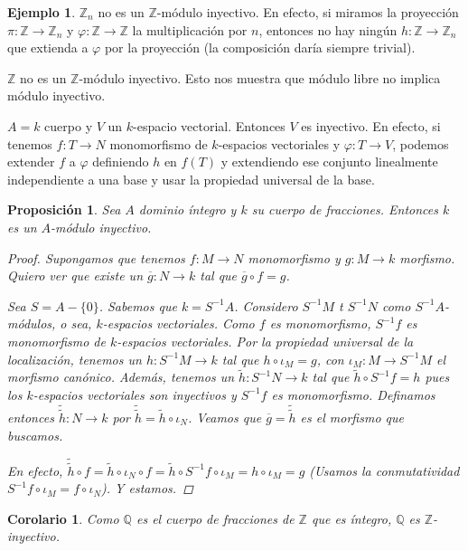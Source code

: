 \documentclass[12pt]{book}
\newtheorem{prop}[teo]{Proposición}
\newtheorem{cor}[teo]{Corolario}
\theoremstyle{definition}
\newtheorem{ex}[teo]{Ejemplo}
\newcommand{\ZZ}{\mathbb{Z}}      %
\newcommand{\QQ}{\mathbb{Q}}
\begin{document}
\begin{ex}
$\ZZ_n$ no es un $\ZZ$-módulo inyectivo. En efecto, si miramos la proyección $\pi:\ZZ\to\ZZ_n$ y $\varphi:\ZZ\to\ZZ$ la multiplicación por $n$, entonces no hay ningún $h:\ZZ\to\ZZ_n$ que extienda a $\varphi$ por la proyección (la composición daría siempre trivial).

$\ZZ$ no es un $\ZZ$-módulo inyectivo. Esto nos muestra que módulo libre no implica módulo inyectivo.

$A=k$ cuerpo y $V$ un $k$-espacio vectorial. Entonces $V$ es inyectivo. En efecto, si tenemos $f:T\to N$ monomorfismo de $k$-espacios vectoriales y $\varphi:T\to V$, podemos extender $f$ a $\varphi$ definiendo $h$ en $f(T)$ y extendiendo ese conjunto linealmente independiente a una base y usar la propiedad universal de la base.
\end{ex}

\begin{prop}
Sea $A$ dominio íntegro y $k$ su cuerpo de fracciones. Entonces $k$ es un $A$-módulo inyectivo.
\begin{proof}
Supongamos que tenemos $f:M\to N$ monomorfismo y $g:M\to k$ morfismo. Quiero ver que existe un $\overline{g}:N\to k$ tal que $\overline{g}\circ f = g$.

Sea $S=A-\{0\}$. Sabemos que $k=S^{-1}A$. Considero $S^{-1}M$ t $S^{-1}N$ como $S^{-1}A$-módulos, o sea, $k$-espacios vectoriales. Como $f$ es monomorfismo, $S^{-1}f$ es monomorfismo de $k$-espacios vectoriales. Por la propiedad universal de la localización, tenemos un $h:S^{-1}M\to k$ tal que $h\circ\iota_M = g$, con $\iota_M:M\to S^{-1}M$ el morfismo canónico. Además, tenemos un $\tilde{h}:S^{-1}N\to k$ tal que $\tilde{h}\circ S^{-1}f = h$ pues los $k$-espacios vectoriales son inyectivos y $S^{-1}f$ es monomorfismo. Definamos entonces $\tilde{\tilde{h}}:N\to k$ por $\tilde{\tilde{h}} = \tilde{h}\circ \iota_N$. Veamos que $\overline{g} = \tilde{\tilde{h}}$ es el morfismo que buscamos.

En efecto, $\tilde{\tilde{h}}\circ f = \tilde{h}\circ\iota_N\circ f = \tilde{h}\circ S^{-1}f\circ \iota_M = h\circ \iota_M = g$ (Usamos la conmutatividad $S^{-1}f\circ \iota_M = f\circ \iota_N$). Y estamos.

\end{proof}
\end{prop}

\begin{cor}
Como $\QQ$ es el cuerpo de fracciones de $\ZZ$ que es íntegro, $\QQ$ es $\ZZ$-inyectivo.
\end{cor}
\end{document}
